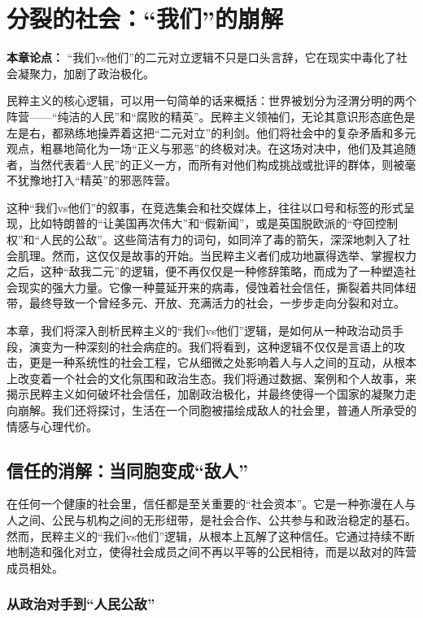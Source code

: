 \chapter{分裂的社会：“我们”的崩解}

\textbf{本章论点：} “我们vs他们”的二元对立逻辑不只是口头言辞，它在现实中毒化了社会凝聚力，加剧了政治极化。

民粹主义的核心逻辑，可以用一句简单的话来概括：世界被划分为泾渭分明的两个阵营——“纯洁的人民”和“腐败的精英”。民粹主义领袖们，无论其意识形态底色是左是右，都熟练地操弄着这把“二元对立”的利剑。他们将社会中的复杂矛盾和多元观点，粗暴地简化为一场“正义与邪恶”的终极对决。在这场对决中，他们及其追随者，当然代表着“人民”的正义一方，而所有对他们构成挑战或批评的群体，则被毫不犹豫地打入“精英”的邪恶阵营。

这种“我们vs他们”的叙事，在竞选集会和社交媒体上，往往以口号和标签的形式呈现，比如特朗普的“让美国再次伟大”和“假新闻”，或是英国脱欧派的“夺回控制权”和“人民的公敌”。这些简洁有力的词句，如同淬了毒的箭矢，深深地刺入了社会肌理。然而，这仅仅是故事的开始。当民粹主义者们成功地赢得选举、掌握权力之后，这种“敌我二元”的逻辑，便不再仅仅是一种修辞策略，而成为了一种塑造社会现实的强大力量。它像一种蔓延开来的病毒，侵蚀着社会信任，撕裂着共同体纽带，最终导致一个曾经多元、开放、充满活力的社会，一步步走向分裂和对立。

本章，我们将深入剖析民粹主义的“我们vs他们”逻辑，是如何从一种政治动员手段，演变为一种深刻的社会病症的。我们将看到，这种逻辑不仅仅是言语上的攻击，更是一种系统性的社会工程，它从细微之处影响着人与人之间的互动，从根本上改变着一个社会的文化氛围和政治生态。我们将通过数据、案例和个人故事，来揭示民粹主义如何破坏社会信任，加剧政治极化，并最终使得一个国家的凝聚力走向崩解。我们还将探讨，生活在一个同胞被描绘成敌人的社会里，普通人所承受的情感与心理代价。

\section{信任的消解：当同胞变成“敌人”}

在任何一个健康的社会里，信任都是至关重要的“社会资本”。它是一种弥漫在人与人之间、公民与机构之间的无形纽带，是社会合作、公共参与和政治稳定的基石。然而，民粹主义的“我们vs他们”逻辑，从根本上瓦解了这种信任。它通过持续不断地制造和强化对立，使得社会成员之间不再以平等的公民相待，而是以敌对的阵营成员相处。

\subsection{从政治对手到“人民公敌”}

